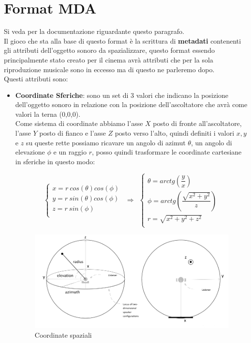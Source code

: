 \documentclass[12pt,a4paper]{report}
\begin{document}
\section{Format MDA}

Si veda \cite{mda} per la documentazione riguardante questo paragrafo.\\

Il gioco che sta alla base di questo format è la scrittura di \textbf{metadati} contenenti gli attributi dell'oggetto sonoro da spazializzare, questo format essendo principalmente stato creato per il cinema avrà attributi che per la sola riproduzione musicale sono in eccesso ma di questo ne parleremo dopo.\\

Questi attributi sono:
\begin{itemize}\label{aaa}
\item \textbf{Coordinate Sferiche}: sono un set di 3 valori che indicano la posizione dell'oggetto sonoro in relazione con la posizione dell'ascoltatore che avrà come valori la terna (0,0,0).\\

Come sistema di coordinate abbiamo l'asse $X$ posto di fronte all'ascoltatore, l'asse $Y$ posto di fianco e l'asse $Z$ posto verso l'alto, quindi definiti i valori $x,y$ e $z$ su queste rette possiamo ricavare un angolo di azimut $\theta$, un angolo di elevazione $\phi$ e un raggio $r$, posso quindi trasformare le coordinate cartesiane in sferiche in questo modo:

\begin{equation}
	\left\{\begin{matrix}
x= r\ cos(\theta) cos(\phi) \\
y= r\ sin(\theta) cos(\phi)\\
z= r\ sin(\phi)\\
\end{matrix}\right. \ \ \Rightarrow \ \  \left\{\begin{matrix}
\theta = arctg \left(\dfrac{y}{x} \right) \\
\phi   = arctg \left(\dfrac{\sqrt{x^2 + y^2 }}{z} \right) \\
r = \sqrt{x^2 +y^2 +z^2 }\\
\end{matrix}\right.
	\label{eq:coordinatepolari}
\end{equation}

\begin{figure}[htbp]
	\centering
	\includegraphics[scale=0.40]{figures/azimut.png}
	\caption {Coordinate spaziali}
	\label{fig:coordinate}
	\end{figure}


\end{itemize}
\end{document}
